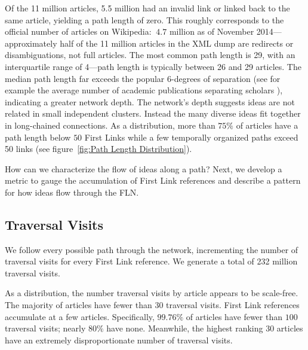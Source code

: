 \documentclass[pre,twocolumn,twoside,superscriptaddress,floatfix, aps, 10pt]{revtex4-1}
\begin{document}
Of the 11 million articles, 5.5 million had an invalid link or linked back to the same article, yielding a path length of zero. 
This roughly corresponds to the official number of articles on Wikipedia: 
$~4.7$ million as of November 2014---approximately half of the 11 million 
articles in the XML dump are redirects or disambiguations, not full articles.
The most common path length is 29, with an interquartile range of 4---path length
is typically between 26 and 29 articles.
The median path length far exceeds the popular 6-degrees of separation (see for 
example the average number of academic publications separating scholars 
\cite{six_degrees}), indicating a greater network depth.
The network's depth suggests ideas are not related in small independent clusters. 
Instead the many diverse ideas fit together in long-chained connections.
As a distribution, more than $75\%$ of articles have a path length below 
$50$ First Links 
while a few temporally organized paths exceed 50 links 
(see figure~\ref{fig:Path Length Distribution}). 

How can we characterize the flow of ideas along a path? Next, we develop 
a metric to gauge the accumulation of First Link references
and describe a pattern for how ideas flow through the FLN.




\subsection{Traversal Visits}

We follow every possible path through the network, incrementing
the number of traversal visits for every First Link reference.
We generate a total of 232 million traversal visits.

As a distribution, the number traversal visits by article appears to be scale-free. 
The majority of articles have fewer than 30 traversal visits. 
First Link references accumulate at a few articles.
Specifically, $99.76\%$ of articles have fewer than $100$ traversal visits; nearly $80\%$ have none. 
Meanwhile, the highest ranking 30 articles have an extremely disproportionate number of traversal visits.
\end{document}
